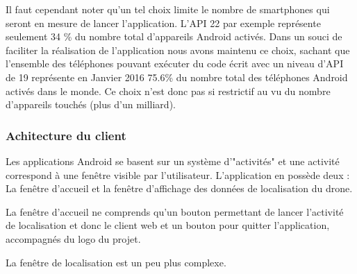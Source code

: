 	Il faut cependant noter qu'un tel choix limite le nombre de smartphones qui seront en mesure de lancer l'application. L'API 22 par exemple représente seulement 34 \% du nombre total d'appareils Android activés. Dans un souci de faciliter la réalisation de l'application nous avons maintenu ce choix, sachant que l'ensemble des téléphones pouvant exécuter du code écrit avec un niveau d'API de 19 représente en Janvier 2016 75.6\% du nombre total des téléphones Android activés dans le monde. Ce choix n'est donc pas si restrictif au vu du nombre d'appareils touchés (plus d'un milliard).

\subsubsection{Achitecture du client}

	Les applications Android se basent sur un système d'"activités" et une activité correspond à une fenêtre visible par l'utilisateur. L'application en possède deux : La fenêtre d'accueil et la fenêtre d'affichage des données de localisation du drone. 
	
	La fenêtre d'accueil ne comprends qu'un bouton permettant de lancer l'activité de localisation et donc le client web et un bouton pour quitter l'application, accompagnés du logo du projet. 
	
	La fenêtre de localisation est un peu plus complexe. 

